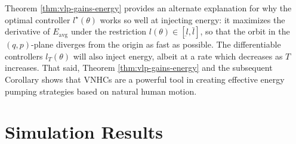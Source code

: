 
Theorem \ref{thm:vlp-gains-energy} provides an alternate explanation for why the
optimal controller \(l^\star(\theta)\) works so well at injecting energy: it
maximizes the derivative of \(E_\text{avg}\) under the restriction 
\(l(\theta) \in [\underbar{l},\bar{l}]\), so that the orbit in the
\((q,p)\)-plane diverges from the origin as fast as possible. The differentiable
controllers \(l_T(\theta)\) will also inject energy, albeit at a rate which
decreases as \(T\) increases. That said, Theorem \ref{thm:vlp-gains-energy} and the
subsequent Corollary shows that VNHCs are a powerful tool in creating effective energy
pumping strategies based on natural human motion.


\section{Simulation Results}

